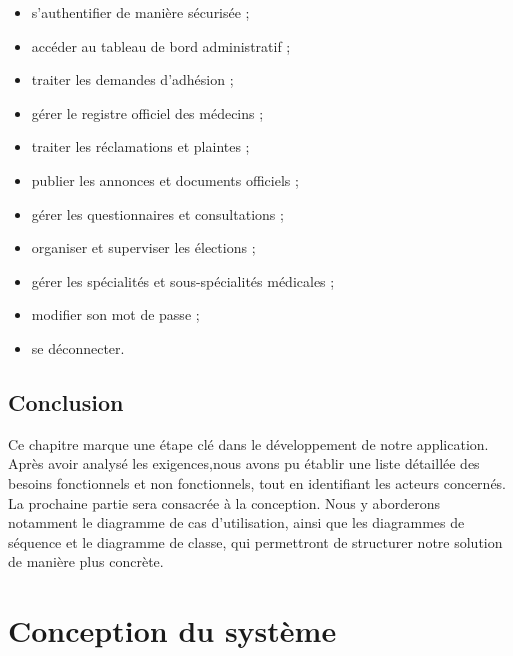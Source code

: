 ﻿\documentclass[12pt,a4paper]{report}
\begin{document}
\begin{itemize}

\item s'authentifier de manière sécurisée ;

\item accéder au tableau de bord administratif ;

\item traiter les demandes d'adhésion ;

\item gérer le registre officiel des médecins ;

\item traiter les réclamations et plaintes ;

\item publier les annonces et documents officiels ;

\item gérer les questionnaires et consultations ;

\item organiser et superviser les élections ;

\item gérer les spécialités et sous-spécialités médicales ;

\item modifier son mot de passe ;

\item se déconnecter.

\end{itemize}

\section{Conclusion}
Ce chapitre marque une étape clé dans le développement de notre application.
Après avoir analysé les exigences,nous avons pu établir une liste détaillée des besoins
fonctionnels et non fonctionnels, tout en identifiant les acteurs concernés.
La prochaine partie sera consacrée à la conception. Nous y aborderons notamment
le diagramme de cas d’utilisation, ainsi que les diagrammes de séquence et le
diagramme de classe, qui permettront de structurer notre solution de manière plus
concrète.

\chapter{Conception du système}
\end{document}
